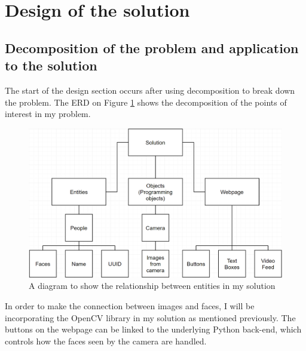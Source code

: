 \documentclass[9pt]{article}
\begin{document}
\section{Design of the solution}\label{sec_design}
\subsection{Decomposition of the problem and application to the solution}\label{sec_decomposition}
The start of the design section occurs after using decomposition to break down the problem. The ERD on Figure \ref{fig_designDecomposition} shows the decomposition of the points of interest in my problem.
\begin{figure}[H]
	\centering
	\includegraphics[width=4.6in]{designDecomposition.png}
	\caption{A diagram to show the relationship between entities in my solution}\label{fig_designDecomposition}
\end{figure}
In order to make the connection between images and faces, I will be incorporating the OpenCV library in my solution as mentioned previously. The buttons on the webpage can be linked to the underlying Python back-end, which controls how the faces seen by the camera are handled.
\end{document}
